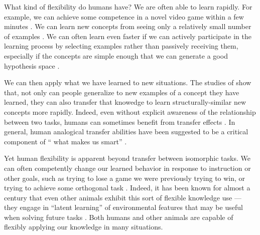 What kind of flexibility do humans have? We are often able to learn rapidly. For example, we can achieve some competence in a novel video game within a few minutes \citep{Lake2016}. We can learn new concepts from seeing only a relatively small number of examples \citep[e.g.][]{Bourne1970}. We can often learn even faster if we can actively participate in the learning process by selecting examples rather than passively receiving them, especially if the concepts are simple enough that we can generate a good hypothesis space \citep{Markant2014a}. \par
We can then apply what we have learned to new situations. The studies of \citet{Bourne1970} show that, not only can people generalize to new examples of a concept they have learned, they can also transfer that knowedge to learn structurally-similar new concepts more rapidly. Indeed, even without explicit awareness of the relationship between two tasks, humans can sometimes benefit from transfer effects \citep[e.g.][]{Day2011}. In general, human analogical transfer abilities have been suggested to be a critical component of `` what makes us smart'' \citep{Gentner2003}. \par
Yet human flexibility is apparent beyond transfer between isomorphic tasks. We can often competently change our learned behavior in response to instruction or other goals, such as trying to lose a game we were previously trying to win, or trying to achieve some orthogonal task \citep{Lake2016}. Indeed, it has been known for almost a century that even other animals exhibit this sort of flexible knowledge use --- they engage in ``latent learning'' of environmental features that may be useful when solving future tasks \citep{Blodgett1929}. Both humans and other animals are capable of flexibly applying our knowledge in many situations. \par
